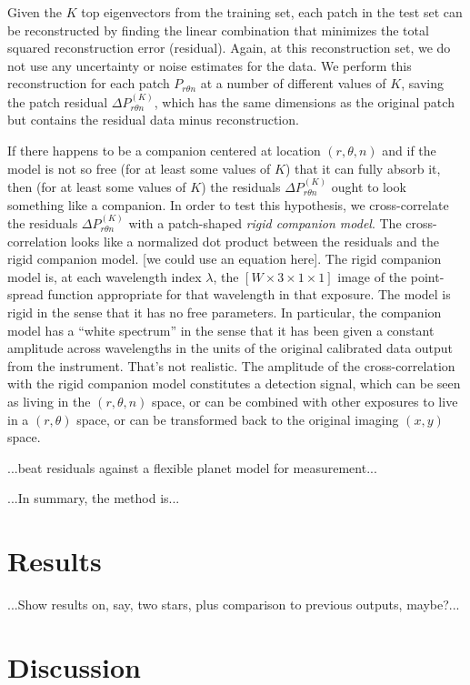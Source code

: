 \documentclass[12pt,pdftex,preprint]{aastex}
\begin{document}
Given the $K$ top eigenvectors from the training set, each patch in
the test set can be reconstructed by finding the linear combination
that minimizes the total squared reconstruction error (residual).
Again, at this reconstruction set, we do not use any uncertainty or
noise estimates for the data.  We perform this reconstruction for each
patch $P_{r \theta n}$ at a number of different values of $K$, saving
the patch residual $\Delta P^{(K)}_{r \theta n}$, which has the same
dimensions as the original patch but contains the residual data minus
reconstruction.

If there happens to be a companion centered at location $(r, \theta,
n)$ and if the model is not so free (for at least some values of $K$)
that it can fully absorb it, then (for at least some values of $K$)
the residuals $\Delta P^{(K)}_{r \theta n}$ ought to look something
like a companion.  In order to test this hypothesis, we
cross-correlate the residuals $\Delta P^{(K)}_{r \theta n}$ with a
patch-shaped \emph{rigid companion model}.  The cross-correlation
looks like a normalized dot product between the residuals and the
rigid companion model.  [we could use an equation here].  The rigid
companion model is, at each wavelength index $\lambda$, the $[W\times
  3\times 1\times 1]$ image of the point-spread function appropriate
for that wavelength in that exposure.  The model is rigid in the sense
that it has no free parameters.  In particular, the companion model
has a ``white spectrum'' in the sense that it has been given a
constant amplitude across wavelengths in the units of the original
calibrated data output from the instrument.  That's not realistic.
The amplitude of the cross-correlation with the rigid companion model
constitutes a detection signal, which can be seen as living in the
$(r, \theta ,n)$ space, or can be combined with other exposures to
live in a $(r, \theta)$ space, or can be transformed back to the
original imaging $(x, y)$ space.

...beat residuals against a flexible planet model for measurement...

...In summary, the method is...

\section{Results}

...Show results on, say, two stars, plus comparison to previous
outputs, maybe?...

\section{Discussion}
\end{document}
